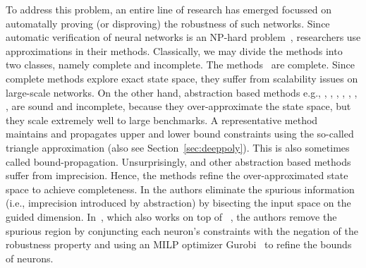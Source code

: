 To address this problem, an entire line of research has emerged focussed on automatally proving (or disproving) the robustness of such networks. Since automatic verification of neural networks is an NP-hard problem~\cite{katz2021reluplex}, researchers use approximations in their methods. Classically, we may divide the methods into two classes, namely complete and incomplete. The methods~\cite{lomuscio2017approach,fischetti2018deep,dutta2018output,cheng2017maximum,katz2017reluplex,katz2019marabou,ehlers2017formal,huang2017safety,wang2021beta,xu2020fast,zhang2022general} are complete.
Since complete methods explore exact state space, they suffer from scalability issues on large-scale networks. On the other hand, abstraction based methods e.g., \cite{dvijotham2018dual}, \cite{gehr2018ai2}, \cite{singh2018fast},  \cite{singh2018boosting}, \cite{weng2018towards}, \cite{wong2018provable}, \cite{zhang2018efficient}, \cite{zhang2018efficient} are sound and incomplete, because they over-approximate the state space, but they scale extremely well to large benchmarks. A representative method \deeppoly{}~\cite{singh2019abstract} maintains and propagates upper and lower bound constraints using the so-called triangle approximation (also see Section~\ref{sec:deeppoly}). This is also sometimes called bound-propagation. %
Unsurprisingly, \deeppoly{} and other abstraction based methods suffer from imprecision. Hence, the methods \cite{wang2018formal,wang2018efficient,elboher2020abstraction,yang2021improving,lin2020art} refine the over-approximated state space to achieve completeness. In \cite{wang2018formal,wang2018efficient,lin2020art} the authors eliminate the spurious information (i.e., imprecision introduced by abstraction) by bisecting the input space on the guided dimension. In~\cite{yang2021improving}, which also works on top of \deeppoly{}~\cite{singh2019abstract}, the authors remove the spurious region by  conjuncting each neuron's constraints with the negation of the robustness property and using an MILP optimizer Gurobi~\cite{gurobioptimizer} to refine the bounds of neurons. 

